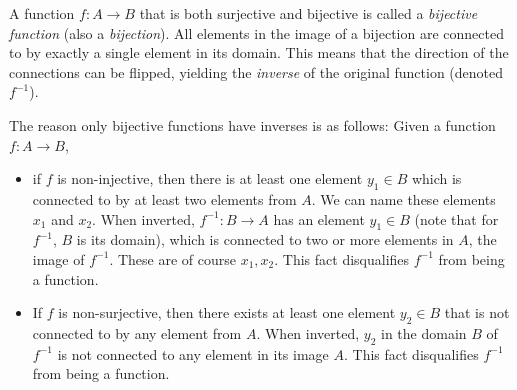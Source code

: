 A function $f:A\to B$ that is both surjective and bijective is called a \emph{bijective function} (also a \emph{bijection}). All elements in the image of a bijection are connected to by exactly a single element in its domain. This means that the direction of the connections can be flipped, yielding the \emph{inverse} of the original function (denoted $f^{-1}$).

The reason only bijective functions have inverses is as follows: Given a function $f:A\to B$,
\begin{itemize}
	\item if $f$ is non-injective, then there is at least one element $y_{1}\in B$ which is connected to by at least two elements from $A$. We can name these elements $x_{1}$ and $x_{2}$. When inverted, $f^{-1}:B\to A$ has an element $y_{1}\in B$ (note that for $f^{-1}$, $B$ is its domain), which is connected to two or more elements in $A$, the image of $f^{-1}$. These are of course $x_{1},x_{2}$. This fact disqualifies $f^{-1}$ from being a function.
	\item If $f$ is non-surjective, then there exists at least one element $y_{2}\in B$ that is not connected to by any element from $A$. When inverted, $y_{2}$ in the domain $B$ of $f^{-1}$ is not connected to any element in its image $A$. This fact disqualifies $f^{-1}$ from being a function.
\end{itemize}

 \blindtext



